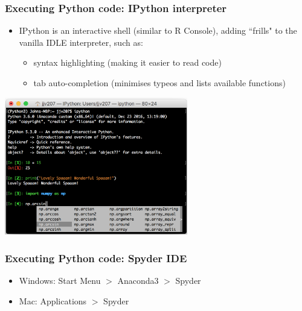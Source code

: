 \documentclass[xcolor=table]{beamer}
\begin{document}
\begin{frame}[fragile]
\frametitle{Executing Python code: IPython interpreter}
\begin{itemize}
	\item IPython is an interactive shell (similar to R Console), adding ``frills" to the vanilla IDLE interpreter, such as:

	\begin{itemize}
		\item syntax highlighting (making it easier to read code)
		\item tab auto-completion (minimises typeos and lists available functions)  
	\end{itemize}
\end{itemize}

\begin{center}
\includegraphics[width=0.6\textwidth]{ipython.png}
\end{center}
\end{frame}

\begin{frame}[fragile]
\frametitle{Executing Python code: Spyder IDE}
    \begin{itemize}
        \item Windows: Start Menu $>$ Anaconda3 $>$ Spyder
            \pause
        \item Mac: Applications $>$ Spyder
    \end{itemize}
\end{frame}
\end{document}
